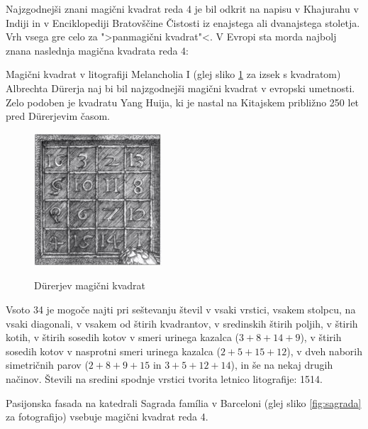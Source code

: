 \documentclass[a4paper,12pt]{article}
\theoremstyle{definition}
\theoremstyle{plain}
\begin{document}
Najzgodnejši znani magični kvadrat reda 4 je bil odkrit na napisu
v Khajurahu v Indiji in v Enciklopediji Bratovščine Čistosti iz enajstega
ali dvanajstega stoletja. Vrh vsega gre celo za ">panmagični kvadrat"<.
V Evropi sta morda najbolj znana naslednja magična kvadrata reda 4:

Magični kvadrat v litografiji Melancholia I (glej sliko \ref{fig:durer}
za izsek s kvadratom) Albrechta Dürerja naj bi bil najzgodnejši magični kvadrat
v evropski umetnosti. Zelo podoben je kvadratu Yang Huija, ki je nastal na Kitajskem
približno 250 let pred Dürerjevim časom. 


\begin{figure}[!ht]
   \caption{Dürerjev magični kvadrat}
   \includegraphics[scale=1.5]{durer.png}
   \centering
   \label{fig:durer}
\end{figure}


Vsoto 34 je mogoče najti pri seštevanju števil v vsaki vrstici, vsakem stolpcu,
na vsaki diagonali, v vsakem od štirih kvadrantov, v sredinskih štirih poljih,
v štirih kotih, v štirih sosedih kotov v smeri urinega kazalca ($3+8+14+9$), v
štirih sosedih kotov v nasprotni smeri urinega kazalca ($2+5+15+12$), v dveh naborih
simetričnih parov ($2+8+9+15$ in $3+5+12+14$), in še na nekaj drugih načinov.
Števili na sredini spodnje vrstici tvorita letnico litografije: 1514.
%

Pasijonska fasada na katedrali Sagrada família v Barceloni
(glej sliko \ref{fig:sagrada} za fotografijo) vsebuje magični kvadrat reda 4.
\end{document}
